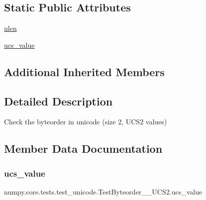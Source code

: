 \subsection*{Static Public Attributes}
\begin{DoxyCompactItemize}
\item 
\hyperlink{classnumpy_1_1core_1_1tests_1_1test__unicode_1_1TestByteorder__2__UCS2_af2ea1205f902adc7f95237fb4c1ae3dd}{ulen}
\item 
\hyperlink{classnumpy_1_1core_1_1tests_1_1test__unicode_1_1TestByteorder__2__UCS2_aa40601a6b0e638310850eca69531cc10}{ucs\+\_\+value}
\end{DoxyCompactItemize}
\subsection*{Additional Inherited Members}


\subsection{Detailed Description}
\begin{DoxyVerb}Check the byteorder in unicode (size 2, UCS2 values)\end{DoxyVerb}
 

\subsection{Member Data Documentation}
\mbox{\label{classnumpy_1_1core_1_1tests_1_1test__unicode_1_1TestByteorder__2__UCS2_aa40601a6b0e638310850eca69531cc10}} 
\subsubsection{\texorpdfstring{ucs\+\_\+value}{ucs\_value}}
{\footnotesize\ttfamily numpy.\+core.\+tests.\+test\+\_\+unicode.\+Test\+Byteorder\+\_\+\_\+\+U\+C\+S2.\+ucs\+\_\+value\hspace{0.3cm}{\ttfamily [static]}}

